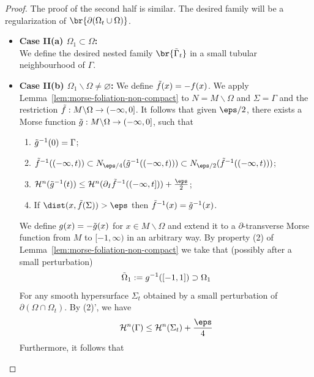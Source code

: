 \begin{lemma}
\begin{proof}
        The proof of the second half is similar. The desired family will be a regularization of $\br{\partial(\Omega_t\cup \Omega)}$.
        \begin{itemize}
            \item \textbf{Case II(a) $\Omega_1 \subset \Omega$:}\\
            We define the desired nested family $\br{\Tilde{\Gamma}_t}$ in a small tubular neighbourhood of $\Gamma$.
            \item \textbf{Case II(b) $\Omega_1\backslash\Omega \neq \varnothing$:}
            We define $\Tilde{f}(x) = -f(x)$. We apply Lemma~\ref{lem:morse-foliation-non-compact} to $N = M\backslash\Omega$ and $\Sigma = \Gamma$ and the restriction $\Tilde{f}: M\backslash\Omega \to (-\infty, 0]$. It follows that given $\eps/2$, there exists a Morse function
            $\Tilde{g}: M\backslash\Omega \to (-\infty, 0]$, such that
            \begin{enumerate}
                \item $\Tilde{g}^{-1}(0) = \Gamma$;
                \item $\Tilde{f}^{-1}((-\infty, t)) \subset N_{\eps/4}(\Tilde{g}^{-1}((-\infty, t))) \subset N_{\eps/2}(\Tilde{f}^{-1}((-\infty, t)))$;
                \item $\mathcal{H}^n(\Tilde{g}^{-1}(t)) \leq \mathcal{H}^n(\partial_I\Tilde{f}^{-1}((-\infty, t])) + \frac{\eps}{2}$;
                \item If $\dist(x, \Tilde{f}(\Sigma)) > \eps$ then $\Tilde{f}^{-1}(x) = \Tilde{g}^{-1}(x)$.
            \end{enumerate}
            We define $g(x) = -\Tilde{g}(x)$ for $x \in M\backslash\Omega$ and extend it to a $\partial$-transverse Morse function from $M$ to $[-1, \infty)$ in an arbitrary way. By property (2) of Lemma~\ref{lem:morse-foliation-non-compact} we take that (possibly after a small perturbation)
            \begin{equation*}
               \Tilde{\Omega}_1 := g^{-1}([-1, 1]) \supset \Omega_1
            \end{equation*}
            For any smooth hypersurface $\Sigma_t$ obtained by a small perturbation of $\partial(\Omega\cap\Omega_t)$. By (2)', we have
            \begin{equation*}
                \mathcal{H}^n(\Gamma) \leq \mathcal{H}^n(\Sigma_t) + \frac{\eps}{4}
            \end{equation*}
            Furthermore, it follows that
            \begin{equation*}

\end{equation*}
\end{itemize}
\end{proof}
\end{lemma}
